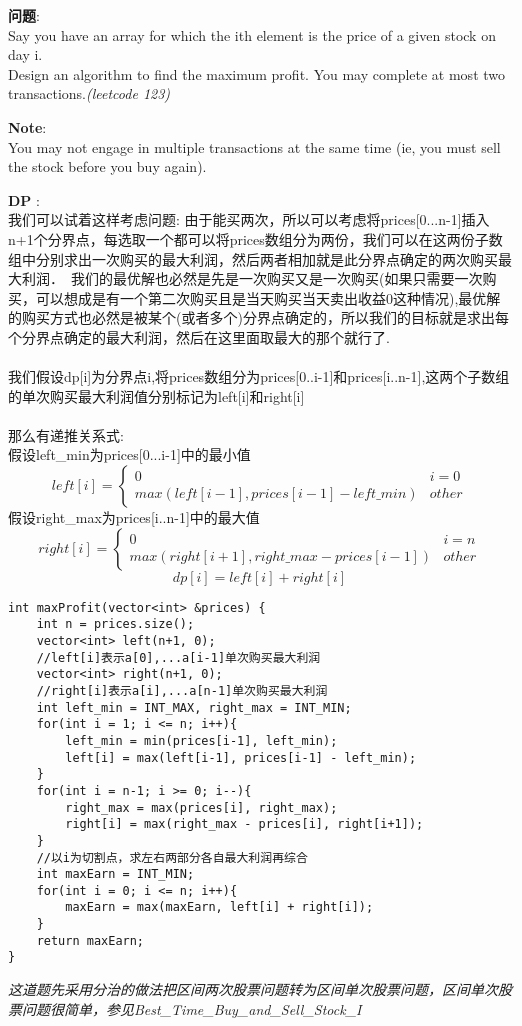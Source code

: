     
\begin{description}
    \item{\textbf{问题}}:\\
Say you have an array for which the ith element is the price of a given stock on day i.\\
Design an algorithm to find the maximum profit. You may complete at most two transactions.\textit{(leetcode 123)}

    \item{\textbf{Note}}:\\
You may not engage in multiple transactions at the same time (ie, you must sell the stock before you buy again).
    \item{\textbf{DP}} : 
	\\我们可以试着这样考虑问题: 由于能买两次，所以可以考虑将prices[0...n-1]插入n+1个分界点，每选取一个都可以将prices数组分为两份，我们可以在这两份子数组中分别求出一次购买的最大利润，然后两者相加就是此分界点确定的两次购买最大利润．　我们的最优解也必然是先是一次购买又是一次购买(如果只需要一次购买，可以想成是有一个第二次购买且是当天购买当天卖出收益0这种情况),最优解的购买方式也必然是被某个(或者多个)分界点确定的，所以我们的目标就是求出每个分界点确定的最大利润，然后在这里面取最大的那个就行了.\\
	\\我们假设dp[i]为分界点i,将prices数组分为prices[0..i-1]和prices[i..n-1],这两个子数组的单次购买最大利润值分别标记为left[i]和right[i]\\
	\\那么有递推关系式:\\
假设left\_min为prices[0...i-1]中的最小值
$$
left[i] =
\begin{cases} 
0 & i = 0 \\
max(left[i-1], prices[i-1] - left\_min) & other
\end{cases}
$$
假设right\_max为prices[i..n-1]中的最大值
$$
right[i] =
\begin{cases} 
0 & i = n \\
max(right[i+1], right\_max - prices[i-1]) & other
\end{cases}
$$
$$
dp[i] = left[i]+right[i]
$$

    \begin{lstlisting}
int maxProfit(vector<int> &prices) {
	int n = prices.size();
	vector<int> left(n+1, 0);
	//left[i]表示a[0],...a[i-1]单次购买最大利润
	vector<int> right(n+1, 0);
	//right[i]表示a[i],...a[n-1]单次购买最大利润
	int left_min = INT_MAX, right_max = INT_MIN;
	for(int i = 1; i <= n; i++){
		left_min = min(prices[i-1], left_min);
		left[i] = max(left[i-1], prices[i-1] - left_min);
	}
	for(int i = n-1; i >= 0; i--){
		right_max = max(prices[i], right_max);
		right[i] = max(right_max - prices[i], right[i+1]);
	}
	//以i为切割点，求左右两部分各自最大利润再综合
	int maxEarn = INT_MIN;
	for(int i = 0; i <= n; i++){
		maxEarn = max(maxEarn, left[i] + right[i]);
	}
	return maxEarn;
}
    \end{lstlisting}
	\textit{这道题先采用分治的做法把区间两次股票问题转为区间单次股票问题，区间单次股票问题很简单，参见Best\_Time\_Buy\_and\_Sell\_Stock\_I}
\end{description}

